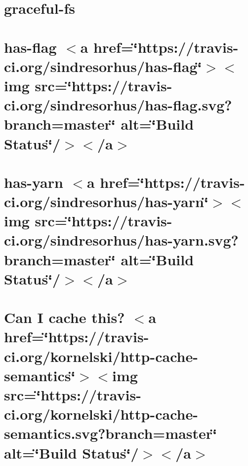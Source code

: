 \let\mypdfximage\pdfximage\def\pdfximage{\immediate\mypdfximage}\documentclass[twoside]{book}
\newcommand{\+}{\discretionary{\mbox{\scriptsize$\hookleftarrow$}}{}{}}
\begin{document}
\chapter{graceful-\/fs}
\label{md__c_1__git_hub__p_r_o_y_e_c_t_o-_i_i_i-_g_o_t_rest-api-node-mysql_node_modules_graceful-fs__r_e_a_d_m_e}

\chapter{has-\/flag $<$a href=\char`\"{}https\+://travis-\/ci.\+org/sindresorhus/has-\/flag\char`\"{}$>$$<$img src=\char`\"{}https\+://travis-\/ci.\+org/sindresorhus/has-\/flag.\+svg?branch=master\char`\"{} alt=\char`\"{}\+Build Status\char`\"{}/$>$$<$/a$>$}
\label{md__c_1__git_hub__p_r_o_y_e_c_t_o-_i_i_i-_g_o_t_rest-api-node-mysql_node_modules_has-flag_readme}

\chapter{has-\/yarn $<$a href=\char`\"{}https\+://travis-\/ci.\+org/sindresorhus/has-\/yarn\char`\"{}$>$$<$img src=\char`\"{}https\+://travis-\/ci.\+org/sindresorhus/has-\/yarn.\+svg?branch=master\char`\"{} alt=\char`\"{}\+Build Status\char`\"{}/$>$$<$/a$>$}
\label{md__c_1__git_hub__p_r_o_y_e_c_t_o-_i_i_i-_g_o_t_rest-api-node-mysql_node_modules_has-yarn_readme}

\chapter{Can I cache this? $<$a href=\char`\"{}https\+://travis-\/ci.\+org/kornelski/http-\/cache-\/semantics\char`\"{}$>$$<$img src=\char`\"{}https\+://travis-\/ci.\+org/kornelski/http-\/cache-\/semantics.\+svg?branch=master\char`\"{} alt=\char`\"{}\+Build Status\char`\"{}/$>$$<$/a$>$}
\label{md__c_1__git_hub__p_r_o_y_e_c_t_o-_i_i_i-_g_o_t_rest-api-node-mysql_node_modules_http-cache-semantics__r_e_a_d_m_e}

\end{document}
